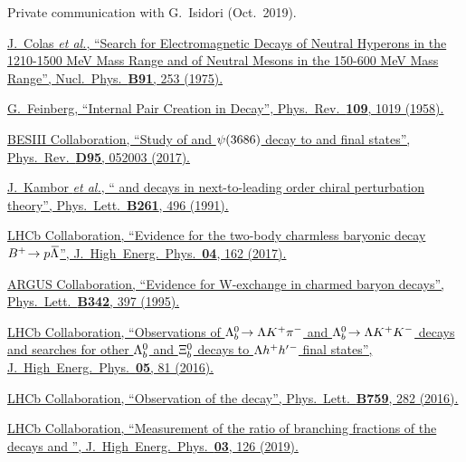 {\begin{thebibliography}{xxx}
	Private communication with G.~Isidori (Oct.~2019).

	\href{https://doi.org/10.1016/0550-3213(75)90469-1}{J.~Colas \textit{et al.}, \enquote{Search for Electromagnetic Decays of Neutral Hyperons in the 1210-1500 MeV Mass Range and of Neutral Mesons in the 150-600 MeV Mass Range}, Nucl.\ Phys.\ \textbf{B91}, 253 (1975).}

	\href{https://doi.org/10.1103/PhysRev.109.1019}{G.~Feinberg, \enquote{Internal Pair Creation in \Sz Decay}, Phys.\ Rev.\ \textbf{109}, 1019 (1958).}

	\href{https://doi.org/10.1103/PhysRevD.95.052003}{BESIII Collaboration, \enquote{Study of \jpsi and $\psi(3686)$ decay to \Lz\Lbar and \Sz\Szbar final states}, Phys.\ Rev.\ \textbf{D95}, 052003 (2017).}

	\href{https://doi.org/10.1016/0370-2693(91)90463-Z}{J.~Kambor \textit{et al.}, \enquote{\decay{\PK}{2\pion} and \decay{\PK}{3\pion} decays in next-to-leading order chiral perturbation theory}, Phys.\ Lett.\ \textbf{B261}, 496 (1991).}

	\href{https://doi.org/10.1007/JHEP04(2017)162}{LHCb Collaboration, \enquote{Evidence for the two-body charmless baryonic decay ${{B}^+}\!\rightarrow {\ensuremath{p}}{\ensuremath{\kern 0.1em\overline{\kern -0.1em\Lambda}}}$}, J.\ High\ Energ.\ Phys.\ \textbf{04}, 162 (2017).}

	\href{https://doi.org/10.1016/0370-2693(94)01513-C}{ARGUS Collaboration, \enquote{Evidence for W-exchange in charmed baryon decays}, Phys.\ Lett.\ \textbf{B342}, 397 (1995).}

	\href{https://doi.org/10.1007/JHEP05(2016)081}{LHCb Collaboration, \enquote{Observations of ${\Lambda}^0_{b}\!\rightarrow {\ensuremath{\Lambda}}{\ensuremath{{K}^+}}{\ensuremath{{\pi}^-}}$ and ${\Lambda}^0_{b}\!\rightarrow {\ensuremath{\Lambda}}{\ensuremath{{K}^+}}{\ensuremath{{K}^-}}$ decays and searches for other ${\Lambda}^0_{b}$ and $\Xi^0_{b}$ decays to ${\Lambda}h^+h'{}^-$ final states}, J.\ High\ Energ.\ Phys.\ \textbf{05}, 81 (2016).}

	\href{https://doi.org/10.1016/j.physletb.2016.05.077}{LHCb Collaboration, \enquote{Observation of the  decay}, Phys.\ Lett.\ \textbf{B759}, 282 (2016).}

	\href{https://doi.org/10.1007/JHEP03(2019)126}{LHCb Collaboration, \enquote{Measurement of the ratio of branching fractions of the decays  and }, J.\ High\ Energ.\ Phys.\ \textbf{03}, 126 (2019).}


\end{thebibliography}}
